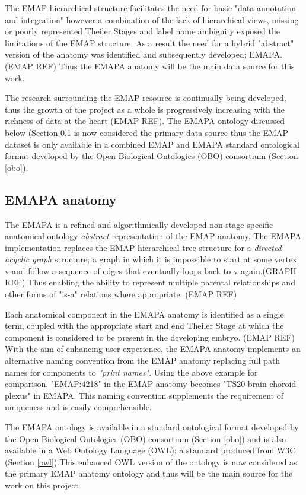 The EMAP hierarchical structure facilitates the need for basic "data annotation and integration" however a combination of the lack of hierarchical views, missing or poorly represented Theiler Stages and label name ambiguity exposed the limitations of the EMAP structure. As a result the need for a hybrid "abstract" version of the anatomy was identified and subsequently developed; EMAPA. (EMAP REF) Thus the EMAPA anatomy will be the main data source for this work.

The research surrounding the EMAP resource is continually being developed, thus the growth of the project as a whole is progressively increasing with the richness of data at the heart (EMAP REF). The EMAPA ontology discussed below (Section \ref{emapaanatomy} is now considered the primary data source thus the EMAP dataset is only available in a combined EMAP and EMAPA standard ontological format developed by the Open Biological Ontologies (OBO) consortium (Section \ref{obo}).


\subsection{EMAPA anatomy}\label{emapaanatomy}
The EMAPA is a refined and algorithmically developed non-stage specific anatomical ontology \textit{abstract} representation of the EMAP anatomy. The EMAPA implementation replaces the EMAP hierarchical tree structure for a \textit{directed acyclic graph} structure; a graph in which it is impossible to start at some vertex v and follow a sequence of edges that eventually loops back to v again.(GRAPH REF) Thus enabling the ability to represent multiple parental relationships and other forms of "is-a" relations where appropriate. (EMAP REF)

Each anatomical component in the EMAPA anatomy is identified as a single term, coupled with the appropriate start and end Theiler Stage at which the component is considered to be present in the developing embryo. (EMAP REF) With the aim of enhancing user experience, the EMAPA anatomy  implements an alternative naming convention from the EMAP anatomy replacing full path names for components to \textit{"print names"}. Using the above example for comparison, "EMAP:4218" in the EMAP anatomy becomes "TS20 brain choroid plexus" in EMAPA. This naming convention supplements the requirement of uniqueness and is easily comprehensible.

The EMAPA ontology is available in a standard ontological format developed by the Open Biological Ontologies (OBO) consortium (Section \ref{obo}) and is also available in a Web Ontology Language (OWL); a standard produced from W3C (Section \ref{owl}).This enhanced OWL version of the ontology is now considered as the primary EMAP anatomy ontology and thus will be the main source for the work on this project. 



